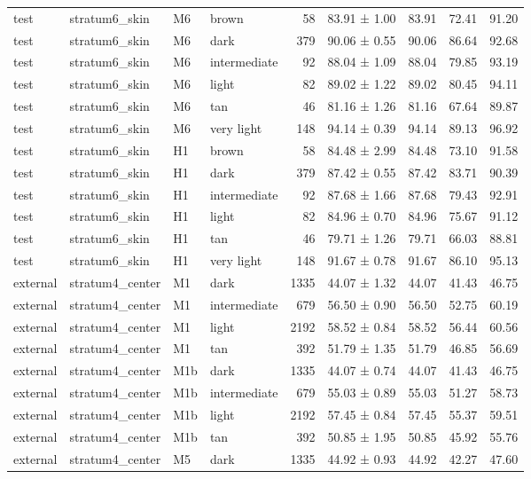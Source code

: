 \begin{tabular}{llllrlrrr}
test & stratum6\_skin & M6 & brown & 58 & 83.91 ± 1.00 & 83.91 & 72.41 & 91.20 \\
test & stratum6\_skin & M6 & dark & 379 & 90.06 ± 0.55 & 90.06 & 86.64 & 92.68 \\
test & stratum6\_skin & M6 & intermediate & 92 & 88.04 ± 1.09 & 88.04 & 79.85 & 93.19 \\
test & stratum6\_skin & M6 & light & 82 & 89.02 ± 1.22 & 89.02 & 80.45 & 94.11 \\
test & stratum6\_skin & M6 & tan & 46 & 81.16 ± 1.26 & 81.16 & 67.64 & 89.87 \\
test & stratum6\_skin & M6 & very light & 148 & 94.14 ± 0.39 & 94.14 & 89.13 & 96.92 \\
test & stratum6\_skin & H1 & brown & 58 & 84.48 ± 2.99 & 84.48 & 73.10 & 91.58 \\
test & stratum6\_skin & H1 & dark & 379 & 87.42 ± 0.55 & 87.42 & 83.71 & 90.39 \\
test & stratum6\_skin & H1 & intermediate & 92 & 87.68 ± 1.66 & 87.68 & 79.43 & 92.91 \\
test & stratum6\_skin & H1 & light & 82 & 84.96 ± 0.70 & 84.96 & 75.67 & 91.12 \\
test & stratum6\_skin & H1 & tan & 46 & 79.71 ± 1.26 & 79.71 & 66.03 & 88.81 \\
test & stratum6\_skin & H1 & very light & 148 & 91.67 ± 0.78 & 91.67 & 86.10 & 95.13 \\
external & stratum4\_center & M1 & dark & 1335 & 44.07 ± 1.32 & 44.07 & 41.43 & 46.75 \\
external & stratum4\_center & M1 & intermediate & 679 & 56.50 ± 0.90 & 56.50 & 52.75 & 60.19 \\
external & stratum4\_center & M1 & light & 2192 & 58.52 ± 0.84 & 58.52 & 56.44 & 60.56 \\
external & stratum4\_center & M1 & tan & 392 & 51.79 ± 1.35 & 51.79 & 46.85 & 56.69 \\
external & stratum4\_center & M1b & dark & 1335 & 44.07 ± 0.74 & 44.07 & 41.43 & 46.75 \\
external & stratum4\_center & M1b & intermediate & 679 & 55.03 ± 0.89 & 55.03 & 51.27 & 58.73 \\
external & stratum4\_center & M1b & light & 2192 & 57.45 ± 0.84 & 57.45 & 55.37 & 59.51 \\
external & stratum4\_center & M1b & tan & 392 & 50.85 ± 1.95 & 50.85 & 45.92 & 55.76 \\
external & stratum4\_center & M5 & dark & 1335 & 44.92 ± 0.93 & 44.92 & 42.27 & 47.60 \\

\end{tabular}
